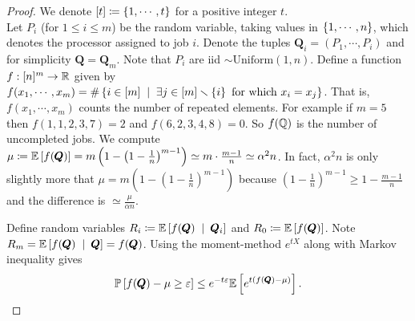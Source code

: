 \begin{proof} We denote $[t] \coloneqq \left\{1,\cdots,t\right\}$ for a positive integer $t$.\\
Let $P_{i}$ (for $1\le i\le m$) be the random variable, taking values in $\left\{1,\cdots,n\right\}$, which denotes the processor assigned to job $i$. Denote the tuples $\pmb Q_{i}=(P_{1},\cdots,P_{i})$ and for simplicity $\pmb Q=\pmb Q_{m}$. Note that $P_{i}$ are iid $\sim \text{Uniform}(1,n)$. Define a function $f:[n]^{m}\to \mathbb{R}$ given by $f(x_{1},\cdots,x_{m}) = \#\set{i\in[m]\st \exists j\in[m]\smallsetminus\set{i} \text{ for which } x_{i}=x_{j}}$. That is, $f(x_{1},\cdots,x_{m})$ counts the number of repeated elements. For example if $m=5$ then $f(1,1,2,3,7) = 2$ and $f(6,2,3,4,8) = 0$. So $f(\mathbb{Q})$ is the number of uncompleted jobs. We compute $\mu\coloneqq \mathbb E\left[ f(\pmb Q) \right] = m\left(1-\left(1-\frac{1}{n}\right)^{m-1}\right)\simeq m\cdot\frac{m-1}{n} \simeq \alpha^{2}n$. In fact, $\alpha^{2}n$ is only slightly more that $\mu=m\left(1-\left(1-\frac{1}{n}\right)^{m-1}\right)$ because $\left(1-\frac{1}{n}\right)^{m-1} \ge 1-\frac{m-1}{n}$ and the difference is $\simeq \frac{\mu}{\alpha n}$.

Define random variables $R_{i} \sett \E{f(\pmb Q)\st \pmb Q_{i}}$ and $R_{0} \coloneqq \mathbb E\left[ f(\pmb Q) \right]$. Note $R_{m} = \E{f(\pmb Q)\st \pmb Q} = f(\pmb Q)$. 
Using the moment-method $e^{tX}$ along with Markov inequality gives $$\mathbb P\left[ f(\pmb Q) - \mu \ge \varepsilon \right] \le e^{-t\varepsilon} \mathbb E\left[ e^{t(f(\pmb Q)-\mu)} \right].$$


\end{proof}
